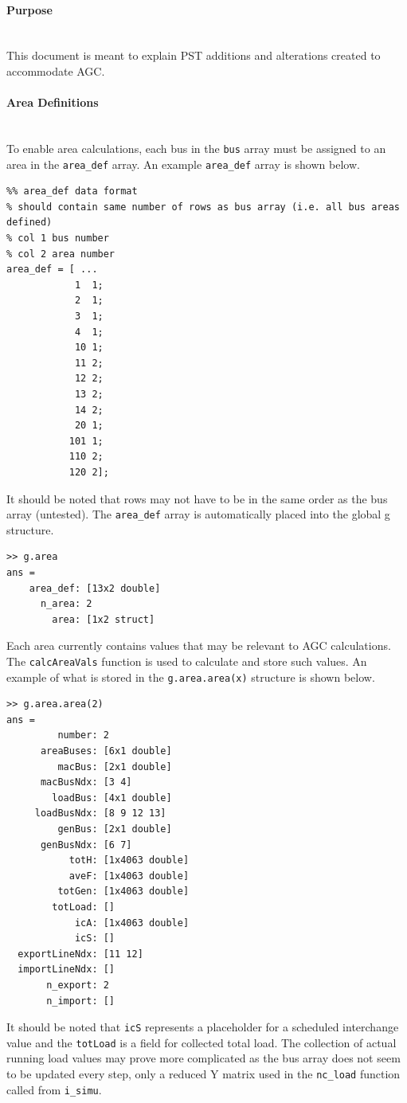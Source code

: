 \documentclass[12pt]{article}
\begin{document}
\onehalfspacing
\paragraph{Purpose} \ \\
This document is meant to explain PST additions and alterations created to accommodate AGC.


\paragraph{Area Definitions} \ \\
To enable area calculations, each bus  in the \verb|bus| array must be assigned to an area in the \verb|area_def| array.
An example \verb|area_def| array is shown below.
\begin{verbatim}
%% area_def data format
% should contain same number of rows as bus array (i.e. all bus areas defined)
% col 1 bus number
% col 2 area number
area_def = [ ...
            1  1;
            2  1;
            3  1;
            4  1;
            10 1;
            11 2;
            12 2;
            13 2;
            14 2; 
            20 1;
           101 1; 
           110 2;
           120 2];
\end{verbatim}

It should be noted that rows may not have to be in the same order as the bus array (untested).
The \verb|area_def| array is automatically placed into the global g structure.
\begin{verbatim}
>> g.area
ans = 
    area_def: [13x2 double]
      n_area: 2
        area: [1x2 struct]
\end{verbatim}

Each area currently contains values that may be relevant to AGC calculations.
The \verb|calcAreaVals| function is used to calculate and store such values.
An example of what is stored in the \verb|g.area.area(x)| structure is shown below.
\begin{verbatim}
>> g.area.area(2)
ans = 
         number: 2
      areaBuses: [6x1 double]
         macBus: [2x1 double]
      macBusNdx: [3 4]
        loadBus: [4x1 double]
     loadBusNdx: [8 9 12 13]
         genBus: [2x1 double]
      genBusNdx: [6 7]
           totH: [1x4063 double]
           aveF: [1x4063 double]
         totGen: [1x4063 double]
        totLoad: []
            icA: [1x4063 double]
            icS: []
  exportLineNdx: [11 12]
  importLineNdx: []
       n_export: 2
       n_import: []
\end{verbatim}
It should be noted that \verb|icS| represents a placeholder for a scheduled interchange value and the \verb|totLoad|  is a field for collected total load.
The collection of actual running load values may prove more complicated as the bus array does not seem to be updated every step, only a reduced Y matrix used in the \verb|nc_load| function called from \verb|i_simu|. 
\end{document}
